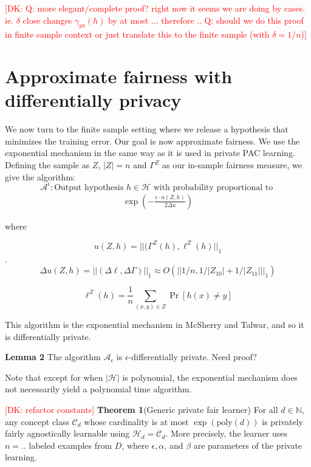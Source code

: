 \documentclass[runningheads]{article}
\newcommand{\dk}[1]{\textcolor{red}{[DK: #1]}}
\newcommand{\A}{\mathcal{A}}
\renewcommand{\H}{\mathcal{H}}
\newcommand{\C}{\mathcal{C}}
\newcommand{\1}{\mathbbm{1}}
\theoremstyle{definition}
\begin{document}
\dk{Q: more elegant/complete proof? right now it seems we are doing by cases. ie. $\delta$ close changes $\gamma_{ya}(h)$ by at most ... therefore ..
Q: should we do this proof in finite sample context or just translate this to the finite sample (with $\delta = 1/n$)}

\section{Approximate fairness with differentially privacy}



We now turn to the finite sample setting where we release a hypothesis that minimizes the training error. Our goal is now approximate fairness. We use the exponential mechanism in the same way as it is used in private PAC learning. Defining the sample as $Z$, $|Z| = n$ and $\Gamma^{Z}$ as our in-sample fairness measure, we give the algorithm:
$$\mathcal{A}^\epsilon : \text{Output hypothesis }h \in \mathcal{H} \text{ with probability proportional to }$$
\begin{align}
\exp(-\frac{\epsilon \cdot u(Z,h)}{2\Delta u})
\end{align}

where

$$u(Z,h) = ||(\Gamma^Z(h), \ell^Z(h)||_{1}$$.
$$\Delta u(Z,h) = ||(\Delta\ell,\Delta{\Gamma})||_1 \approx O(||1/n,1/|Z_{10}|+1/|Z_{11}|||_1)$$

$$\ell^Z(h) = \frac{1}{n} \sum_{(x,y) \in Z}\Pr[h(x) \neq y]$$



This algorithm is the exponential mechanism in McSherry and Talwar, and so it is differentially private.

{\bf Lemma 2} The algorithm $\A_\epsilon$ is $\epsilon$-differentially private.
Need proof?

Note that except for when $|\H|$ is polynomial, the exponential mechanism does not necessarily yield a polynomial time algorithm.

\dk{refactor constants}
{\bf Theorem 1}(Generic private fair learner) For all $d \in \mathbb{N}$, any concept class $\mathcal{C}_d$ whose cardinality is at most $\exp(\text{poly}(d))$ is privately fairly agnostically learnable using $\H_d = \C_d$. More precisely, the learner uses $n = ..$ labeled examples from $D$, where $\epsilon, \alpha$, and $\beta$ are parameters of the private learning.
\end{document}
